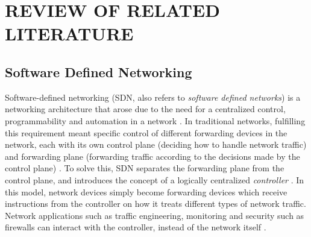 \chapter{REVIEW OF RELATED LITERATURE}

\section{Software Defined Networking}
Software-defined networking (SDN, also refers to \textit{software defined networks}) is a networking architecture that arose due to the need for a centralized control, programmability and automation in a network \cite{open_networking_foundation_software-defined_2013}. In traditional networks, fulfilling this requirement meant specific control of different forwarding devices in the network, each with its own control plane (deciding how to handle network traffic) and forwarding plane (forwarding traffic according to the decisions made by the control plane) \cite{kreutz_software-defined_2015}. To solve this, SDN separates the forwarding plane from the control plane, and introduces the concept of a logically centralized \textit{controller} \cite{open_networking_foundation_software-defined_2013}. In this model, network devices simply become forwarding devices which receive instructions from the controller on how it treats different types of network traffic. Network applications such as traffic engineering, monitoring and security such as firewalls can interact with the controller, instead of the network itself \cite{kreutz_software-defined_2015}.

